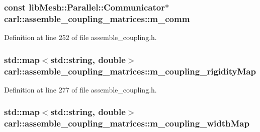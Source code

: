 \subsubsection[{m\+\_\+comm}]{\setlength{\rightskip}{0pt plus 5cm}const lib\+Mesh\+::\+Parallel\+::\+Communicator$\ast$ carl\+::assemble\+\_\+coupling\+\_\+matrices\+::m\+\_\+comm\hspace{0.3cm}{\ttfamily [protected]}}\label{classcarl_1_1assemble__coupling__matrices_a8a2164781f1a5f75ab1a5c7c4744f2f4}


Definition at line 252 of file assemble\+\_\+coupling.\+h.

\hypertarget{classcarl_1_1assemble__coupling__matrices_a2133e2d98a47de9569137f31d69c58ee}{}
\subsubsection[{m\+\_\+coupling\+\_\+rigidity\+Map}]{\setlength{\rightskip}{0pt plus 5cm}std\+::map$<$std\+::string, double$>$ carl\+::assemble\+\_\+coupling\+\_\+matrices\+::m\+\_\+coupling\+\_\+rigidity\+Map\hspace{0.3cm}{\ttfamily [protected]}}\label{classcarl_1_1assemble__coupling__matrices_a2133e2d98a47de9569137f31d69c58ee}


Definition at line 277 of file assemble\+\_\+coupling.\+h.

\hypertarget{classcarl_1_1assemble__coupling__matrices_a72f1024c5634b4e31b8583ee60bb14bc}{}
\subsubsection[{m\+\_\+coupling\+\_\+width\+Map}]{\setlength{\rightskip}{0pt plus 5cm}std\+::map$<$std\+::string, double$>$ carl\+::assemble\+\_\+coupling\+\_\+matrices\+::m\+\_\+coupling\+\_\+width\+Map\hspace{0.3cm}{\ttfamily [protected]}}\label{classcarl_1_1assemble__coupling__matrices_a72f1024c5634b4e31b8583ee60bb14bc}


